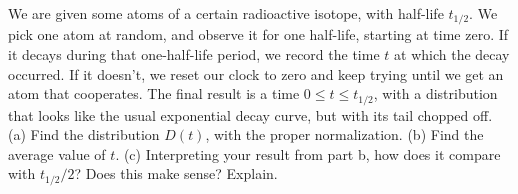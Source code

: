 We are given some atoms of a certain radioactive isotope, with
half-life $t_{1/2}$. We pick one atom at random, and observe it
for one half-life, starting at time zero. If it decays during
that one-half-life period, we record the time $t$ at which the
decay occurred. If it doesn't, we reset our clock to zero and keep
trying until we get an atom that cooperates. The final result
is a time $0\le t\le t_{1/2}$, with a distribution that looks
like the usual exponential decay curve, but with its tail chopped
off.\\
(a) Find the distribution $D(t)$, with the proper normalization.\answercheck\hwendpart
(b) Find the average value of $t$.\answercheck\hwendpart
(c) Interpreting your result from part b, how does it compare
with $t_{1/2}/2$? Does this make sense? Explain.
